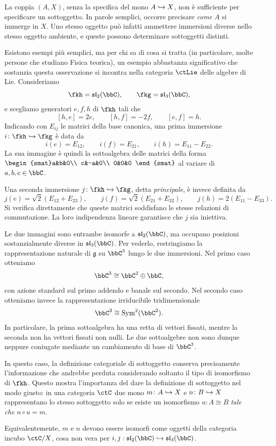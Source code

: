 \begin{remark}
  La coppia $(A,X)$, senza la specifica del mono $A\hookrightarrow X$, non è sufficiente per specificare un sottoggetto. In parole semplici, occorre precisare \emph{come} $A$ si immerge in $X$. Uno stesso oggetto può infatti ammettere immersioni diverse nello stesso oggetto ambiente, e queste possono determinare sottoggetti distinti.

Esistono esempi più semplici, ma per chi sa di cosa si tratta (in particolare, molte persone che studiano Fisica teorica), un esempio abbastanza significativo che sostanzia questa osservazione si incontra nella categoria $\ctLie$ delle algebre di Lie. Consideriamo
\[
\fkh=\mathfrak{sl}_2(\bbC),
\qquad
\fkg=\mathfrak{sl}_3(\bbC),
\]
e scegliamo generatori $e,f,h$ di $\fkh$ tali che
\[
[h,e]=2e,\qquad [h,f]=-2f,\qquad [e,f]=h.
\]
Indicando con $E_{ij}$ le matrici della base canonica, una prima immersione
$i\colon\fkh\hookrightarrow\fkg$ è data da
\[
i(e)=E_{12},\qquad
i(f)=E_{21},\qquad
i(h)=E_{11}-E_{22}.
\]
La sua immagine è quindi la sottoalgebra delle matrici della forma $\begin{smat}a&b&0\\
c&-a&0\\
0&0&0
\end{smat}$ al variare di $a,b,c\in\bbC$.

Una seconda immersione $j\colon\fkh\hookrightarrow\fkg$, detta \emph{principale}, è invece definita da
\[
j(e)=\sqrt{2}(E_{12}+E_{23}),\qquad
j(f)=\sqrt{2}(E_{21}+E_{32}),\qquad
j(h)=2(E_{11}-E_{33}).
\]
Si verifica direttamente che queste matrici soddisfano le stesse relazioni di commutazione. La loro indipendenza lineare garantisce che $j$ sia iniettiva.

Le due immagini sono entrambe isomorfe a $\mathfrak{sl}_2(\bbC)$, ma occupano posizioni sostanzialmente diverse in $\mathfrak{sl}_3(\bbC)$. Per vederlo, restringiamo la rappresentazione naturale di $\mathfrak{g}$ su $\bbC^3$ lungo le due immersioni. Nel primo caso otteniamo
\[
\bbC^3\cong\bbC^2\oplus\bbC,
\]
con azione standard sul primo addendo e banale sul secondo. Nel secondo caso otteniamo invece la rappresentazione irriducibile tridimensionale
\[
\bbC^3\cong\operatorname{Sym}^2(\bbC^2).
\]
In particolare, la prima sottoalgebra ha una retta di vettori fissati, mentre la seconda non ha vettori fissati non nulli. Le due sottoalgebre non sono dunque neppure coniugate mediante un cambiamento di base di $\bbC^3$.

In questo caso, la definizione categoriale di sottoggetto conserva precisamente l'informazione che andrebbe perduta considerando soltanto il tipo di isomorfismo di $\fkh$. Questo mostra l'importanza del dare la definizione di sottoggetto nel modo giusto: in una categoria $\ctC$ due mono $m\colon A\hookrightarrow X$ e $n\colon B\hookrightarrow X$ rappresentano lo stesso sottoggetto solo se esiste un isomorfismo $u\colon A \cong B$ \emph{tale che $n\circ u=m$}.

Equivalentemente, $m$ e $n$ devono essere isomorfi come oggetti
della categoria incubo $\ctC/X$, cosa non vera per $i,j : \mathfrak{sl}_2(\bbC) \mono \mathfrak{sl}_3(\bbC)$.
\end{remark}
